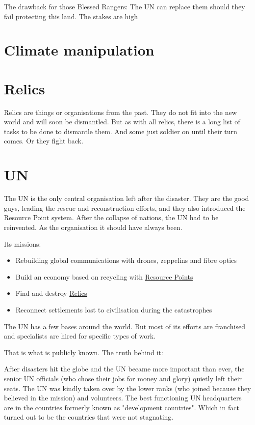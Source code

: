 The drawback for those Blessed Rangers: The UN can replace them should they fail protecting this land. The stakes are high

\section{Climate manipulation}

\section{Relics}
\label{sec:Relic}
Relics are things or organisations from the past. They do not fit into the new world and will soon be dismantled. But as with all relics, there is a long list of tasks to be done to dismantle them. And some just soldier on until their turn comes. Or they fight back.

\section{UN}
\label{sec:UN}

The UN is the only central organisation left after the disaster. They are the good guys, leading the rescue and reconstruction efforts, and they also introduced the Resource Point system. After the collapse of nations, the UN had to be reinvented. As the organisation it should have always been.

Its missions:

\begin{itemize}
    \item Rebuilding global communications with drones, zeppelins and fibre optics
    \item Build an economy based on recycling with \hyperref[sec:Resource Points]{Resource Points}
    \item Find and destroy \hyperref[sec:Relic]{Relics}
    \item Reconnect settlements lost to civilisation during the catastrophes
\end{itemize}

The UN has a few bases around the world. But most of its efforts are franchised and specialists are hired for specific types of work.

That is what is publicly known. The truth behind it:

After disasters hit the globe and the UN became more important than ever, the senior UN officials (who chose their jobs for money and glory) quietly left their seats. The UN was kindly taken over by the lower ranks (who joined because they believed in the mission) and volunteers. The best functioning UN headquarters are in the countries formerly known as "development countries". Which in fact turned out to be the countries that were not stagnating.

